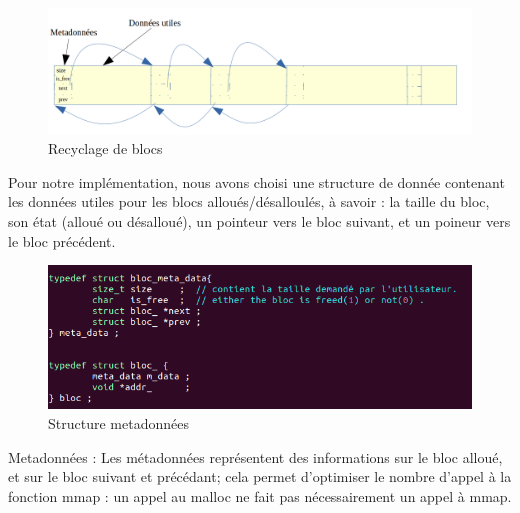 \documentclass[12pt,a4paper]{article}
\begin{document}
 
\begin{figure}[htp]
    \centering
\includegraphics[width=12cm]{struct.png}    
   \caption[Recyclag de blocs]{Recyclage de blocs}
\end{figure}





Pour notre implémentation, nous avons choisi une structure de donnée contenant les données utiles pour les blocs alloués/désalloulés, à savoir : la taille du bloc, son état (alloué ou désalloué), un pointeur vers le bloc suivant, et un poineur vers le bloc précédent.


\begin{figure}[htp]
    \centering
\includegraphics[width=12cm]{struct1.png}    
   \caption[Structure de donnée]{Structure metadonnées}
\end{figure}


Metadonnées : Les métadonnées représentent des informations sur le bloc alloué, et sur le bloc suivant et précédant; cela permet d'optimiser le nombre d'appel à la fonction mmap : un appel au malloc ne fait  pas nécessairement un appel à mmap.
\end{document}
